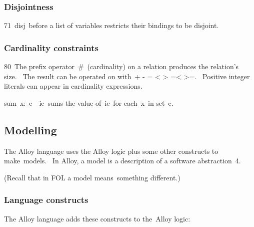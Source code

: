 \documentclass[oneside]{book}
\begin{document}
\subsubsection{Disjointness}
71~disj~before a list of variables restricts their bindings to be disjoint.~

\subsubsection{Cardinality constraints}
80~The prefix operator~\#~(cardinality) on a relation produces the relation's size.~ The result can be operated on with~+ - = {\textless} {\textgreater} ={\textless} {\textgreater}=.~ Positive integer literals can appear in cardinality expressions.~

sum~x:~e~{\textbar}~ie~sums the value of~ie~for each~x~in set~e.~

\subsection{Modelling}
The Alloy language uses the Alloy logic plus some other constructs to make~models.~ In Alloy, a model is {\textquotedbl}a description of a software abstraction{\textquotedbl}~4.~

(Recall that in FOL a model means~something different.)~

\subsubsection{Language constructs}
The Alloy language adds these constructs to the~Alloy logic:~
\end{document}
